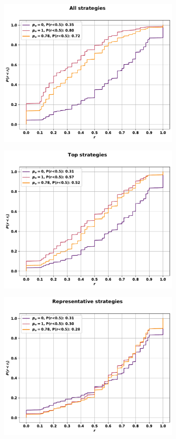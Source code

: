 \begin{figure}[!htbp]
    \begin{subfigure}{.5\textwidth}
    \centering
    \includegraphics[width=.75\textwidth]{src/chapters/07/img/cfd_to_sequence_all_strategies.pdf}
    \end{subfigure}\hfill
    \begin{subfigure}{.5\textwidth}
    \centering
    \includegraphics[width=.75\textwidth]{src/chapters/07/img/cfd_to_sequence_top_strategies.pdf}
    \end{subfigure}
    \begin{subfigure}{.5\textwidth}
    \centering
    \includegraphics[width=.75\textwidth]{src/chapters/07/img/cfd_to_sequence_representative_strategies.pdf}

\end{subfigure}
\end{figure}
